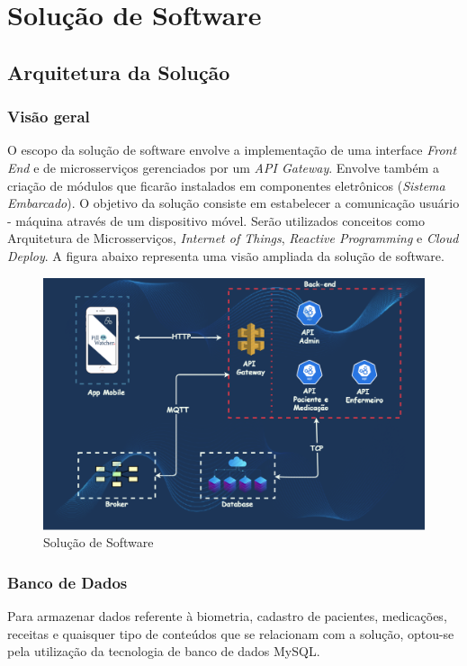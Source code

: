\chapter[Solução de Software]{Solução de Software}

\section{Arquitetura da Solução}

\subsection{Visão geral}

O escopo da solução de software envolve a implementação de uma interface \emph{Front End} e de microsserviços gerenciados por um \emph{API Gateway}. Envolve também a criação de módulos que ficarão instalados em componentes eletrônicos (\emph{Sistema Embarcado}). O objetivo da solução consiste em estabelecer a comunicação usuário - máquina através de um dispositivo móvel. Serão utilizados conceitos como Arquitetura de Microsserviços, \emph{Internet of Things}, \emph{Reactive Programming} e \emph{Cloud Deploy}. A figura abaixo representa uma visão ampliada da solução de software.

\begin{figure}[H]
    \centering
    \includegraphics[width=1.0\textwidth]{figuras/solucao_software.png}
    \caption{Solução de Software}
    \label{fig:software_solution}
\end{figure}

\subsection{Banco de Dados}
Para armazenar dados referente à biometria, cadastro de pacientes, medicações, receitas e quaisquer tipo de conteúdos que se relacionam com a solução, optou-se pela utilização da tecnologia de banco de dados MySQL. 

